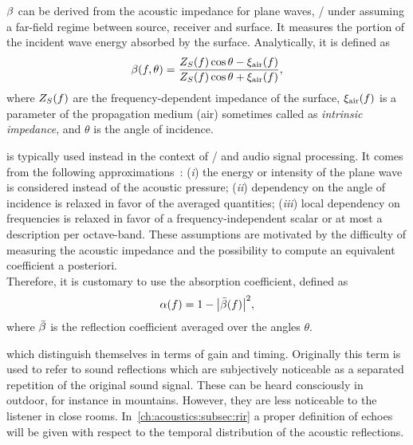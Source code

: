  $\beta$ can be derived from the acoustic impedance
for plane waves, \ie/ under assuming a far-field regime between source, receiver and surface.
It measures the portion of the incident wave energy absorbed by the surface.
Analytically, it is defined as  
\begin{equation}
    \beta(f, \theta) = \frac{Z_{S}(f)\cos{\theta} - \xi_\text{air}(f)}{Z_{S}(f)\cos{\theta} + \xi_\text{air}(f)}
    ,
\end{equation}
where $Z_{S}(f)$ are the frequency-dependent impedance of the surface, $\xi_\text{air}(f)$ is a parameter of the propagation medium (air)
sometimes called as \textit{intrinsic impedance}, and $\theta$ is the angle of incidence.

 is typically used instead in the context of \GA/ and audio signal processing.
It comes from the following approximations~:
(\textit{i}) the energy or intensity of the plane wave is considered instead of the acoustic pressure;
(\textit{ii}) dependency on the angle of incidence is relaxed in favor of the averaged quantities;
(\textit{iii}) local dependency on frequencies is relaxed in favor of a frequency-independent scalar or at most a description per octave-band.
These assumptions are motivated by the difficulty of measuring the acoustic impedance
and the possibility to compute an equivalent coefficient a posteriori.
\\Therefore, it is customary to use the absorption coefficient, defined as
\begin{equation}
    \absCoeff(f) = 1 - \abs{\bar{\reflCoeff}(f)}^2
    ,
\end{equation}
where $\bar{\beta}$ is the reflection coefficient averaged over the angles $\theta$.

 which  distinguish themselves in terms of gain and timing.
Originally this term is used to refer to sound reflections which are subjectively noticeable as a separated repetition of the original sound signal.
These can be heard consciously in outdoor, for instance in mountains. However, they are less noticeable to the listener in close rooms.
In~\cref{ch:acoustics:subsec:rir} a proper definition of echoes will be given with respect to the temporal distribution of the acoustic reflections.


